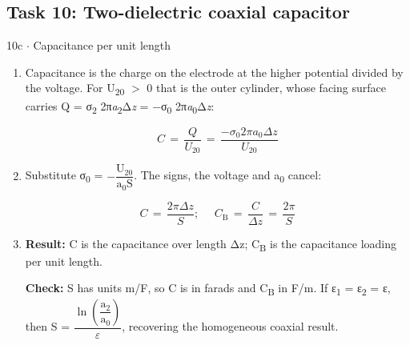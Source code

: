 \documentclass[11pt]{article}
\begin{document}
\begin{keepsection}\subsection{Task 10: Two-dielectric coaxial capacitor}

\begin{workedbox}{10c \ensuremath{\cdot} Capacitance per unit length}
\begin{enumerate}
\item {}
Capacitance is the charge on the electrode at the higher potential divided by the voltage. For U\textsubscript{20} \ensuremath{>} 0 that is the outer cylinder, whose facing surface carries Q = σ\textsubscript{2} 2π\textit{a}\textsubscript{2}Δ\textit{z} = \ensuremath{-}σ\textsubscript{0} 2π\textit{a}\textsubscript{0}Δ\textit{z}:

\begin{equation*}{C}\, =\, \dfrac{{Q}}{{U}_{20}}\, =\, \dfrac{-σ_{0}2π{a}_{0}Δ{z}}{{U}_{20}}\end{equation*}
\item {}
Substitute σ\textsubscript{0} = \ensuremath{-}{\small\ensuremath{\dfrac{\mathrm{U}_{20}}{\mathrm{a}_{0}\mathrm{S}}}}. The signs, the voltage and a\textsubscript{0} cancel:

\begin{equation*}{C}\, =\, \dfrac{2πΔ{z}}{{S}};\, \quad \, {C}_{\mathrm{B}}\, =\, \dfrac{{C}}{Δ{z}}\, =\, \dfrac{2π}{{S}}\end{equation*}
\item {}
\textbf{Result:} C is the capacitance over length Δz; C\textsubscript{B} is the capacitance loading per unit length.

\textbf{Check:} S has units m/F, so C is in farads and C\textsubscript{B} in F/m. If ε\textsubscript{1} = ε\textsubscript{2} = ε, then S = {\small\ensuremath{\dfrac{\ln (\dfrac{\mathrm{a}_{2}}{\mathrm{a}_{0}})}{ε}}}, recovering the homogeneous coaxial result.
\end{enumerate}
\end{workedbox}

\end{keepsection}
\end{document}
